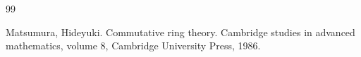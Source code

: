 \begin{thebibliography}{99}

Matsumura, Hideyuki.
\newblock Commutative ring theory.
\newblock Cambridge studies in advanced mathematics, volume 8, Cambridge University Press, 1986.

\end{thebibliography}

